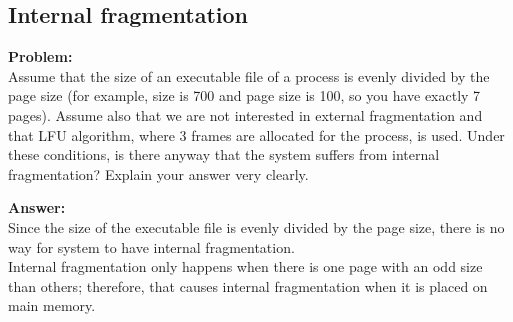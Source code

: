 \subsection{Internal fragmentation}
\textbf{Problem:} \\
Assume that the size of an executable file of a process is evenly divided by the page size
(for example, size is 700 and page size is 100, so you have exactly 7 pages). Assume also
that we are not interested in external fragmentation and that LFU algorithm, where 3 frames
are allocated for the process, is used. Under these conditions, is there anyway that the
system suffers from internal fragmentation? Explain your answer very clearly.

\textbf{Answer:} \\
Since the size of the executable file is evenly divided by the page size, there is no way for system to have internal fragmentation.\\ Internal fragmentation only happens when there is one page with an odd size than others; therefore, that causes internal fragmentation when it is placed on main memory.


